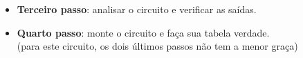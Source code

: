 \documentclass{beamer}
\newcommand{\comment}[1]{{\color{structure.fg!70!white}\footnotesize #1}}
\begin{document}
\begin{frame}
\begin{itemize}
\begin{center}
\end{center}

\pause\pause\pause\pause\pause

\item \textbf{Terceiro passo}: analisar o circuito e verificar as saídas.

\pause

\item \textbf{Quarto passo}: monte o circuito e faça sua tabela verdade.\\
\comment{(para este circuito, os dois últimos passos não tem a menor graça)} 

\end{itemize}
\end{frame}


\newcommand{\INP}[1]{\fcolorbox{white}{pnk}{#1}}
\newcommand{\OUT}[1]{\fcolorbox{white}{skb}{#1}}
\end{document}
